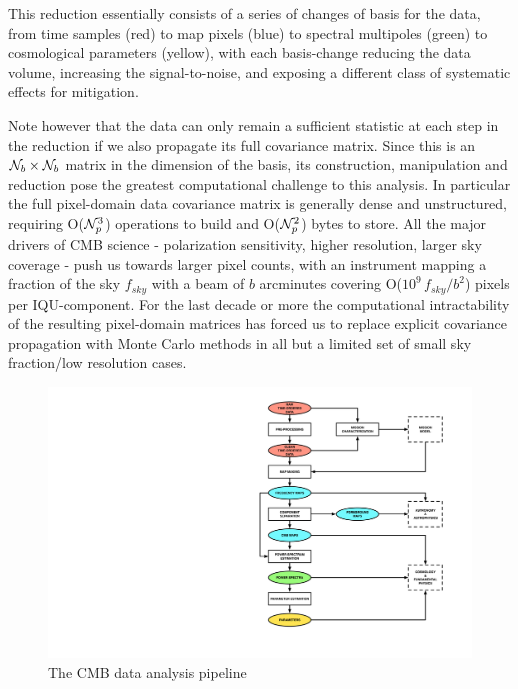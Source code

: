 This reduction essentially consists of a series of changes of basis for the data, from time samples (red) to map pixels (blue) to spectral multipoles (green) to cosmological parameters (yellow), with each basis-change reducing the data volume, increasing the signal-to-noise, and exposing a different class of systematic effects for mitigation.

Note however that the data can only remain a sufficient statistic at each step in the reduction if we also propagate its full covariance matrix. Since this is an ${\cal N}_b \times {\cal N}_b$ matrix in the dimension of the basis, its construction, manipulation and reduction pose the greatest computational challenge to this analysis. In particular the full pixel-domain data covariance matrix is generally dense and unstructured, requiring O(${\cal N}_p^3$) operations to build and O(${\cal N}_p^2$) bytes to store. All the major drivers of CMB science - polarization sensitivity, higher resolution, larger sky coverage - push us towards larger pixel counts, with an instrument mapping a fraction of the sky $f_{sky}$ with a beam of $b$ arcminutes covering O($10^9 \, f_{sky}/b^2$) pixels per IQU-component. For the last decade or more the computational intractability of the resulting pixel-domain matrices has forced us to replace explicit covariance propagation with Monte Carlo methods in all but a limited set of small sky fraction/low resolution cases.

\begin{figure}[htbp]
\centering
\includegraphics[width=1\textwidth]{Analysis/da}
\caption{The CMB data analysis pipeline}
\label{fig_da}
\end{figure}

